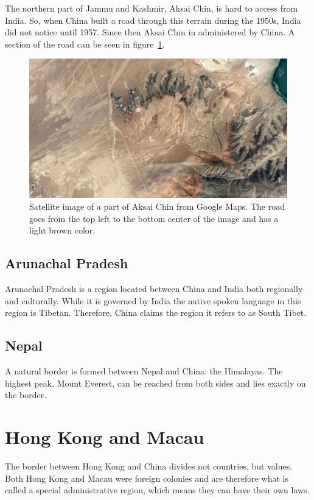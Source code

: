 \documentclass[conference]{IEEEtran}
\begin{document}
	The northern part of Jammu and Kashmir, Aksai Chin, is hard to access from India. So, when China built a road through this terrain during the 1950s, India did not notice until 1957. Since then Aksai Chin in administered by China. A section of the road can be seen in figure~\ref{pic:india_jammuAndKashmir_road}.
	
	\begin{figure}[t]
	\centering
	\includegraphics[width=\linewidth]{img/india_jammuAndKashmir_road.png}
	\caption{Satellite image of a part of Aksai Chin from Google Maps. The road goes from the top left to the bottom center of the image and has a light brown color.}
	\label{pic:india_jammuAndKashmir_road}
	\end{figure}
	
	\subsection{Arunachal Pradesh}
	Arunachal Pradesh is a region located between China and India both regionally and culturally. While it is governed by India the native spoken language in this region is Tibetan. Therefore, China claims the region it refers to as South Tibet.
	
	\subsection{Nepal}
	A natural border is formed between Nepal and China: the Himalayas. The highest peak, Mount Everest, can be reached from both sides and lies exactly on the border.
	
	\section{Hong Kong and Macau}
	The border between Hong Kong and China divides not countries, but values. Both Hong Kong and Macau were foreign colonies and are therefore what is called a special administrative region, which means they can have their own laws.
	
\end{document}
